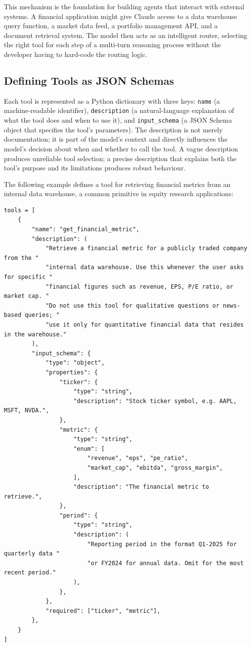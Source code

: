 This mechanism is the foundation for building agents that interact with external systems.
A financial application might give Claude access to a data warehouse query function,
a market data feed, a portfolio management API, and a document retrieval system. The
model then acts as an intelligent router, selecting the right tool for each step of a
multi-turn reasoning process without the developer having to hard-code the routing logic.

\subsection{Defining Tools as JSON Schemas}
\label{app:sdk-commercial:tools:schemas}

Each tool is represented as a Python dictionary with three keys: \texttt{name} (a
machine-readable identifier), \texttt{description} (a natural-language explanation of
what the tool does and when to use it), and \texttt{input\_schema} (a JSON Schema
object that specifies the tool's parameters). The description is not merely
documentation; it is part of the model's context and directly influences the model's
decision about when and whether to call the tool. A vague description produces
unreliable tool selection; a precise description that explains both the tool's purpose
and its limitations produces robust behaviour.

The following example defines a tool for retrieving financial metrics from an internal
data warehouse, a common primitive in equity research applications:

\begin{verbatim}
tools = [
    {
        "name": "get_financial_metric",
        "description": (
            "Retrieve a financial metric for a publicly traded company from the "
            "internal data warehouse. Use this whenever the user asks for specific "
            "financial figures such as revenue, EPS, P/E ratio, or market cap. "
            "Do not use this tool for qualitative questions or news-based queries; "
            "use it only for quantitative financial data that resides in the warehouse."
        ),
        "input_schema": {
            "type": "object",
            "properties": {
                "ticker": {
                    "type": "string",
                    "description": "Stock ticker symbol, e.g. AAPL, MSFT, NVDA.",
                },
                "metric": {
                    "type": "string",
                    "enum": [
                        "revenue", "eps", "pe_ratio",
                        "market_cap", "ebitda", "gross_margin",
                    ],
                    "description": "The financial metric to retrieve.",
                },
                "period": {
                    "type": "string",
                    "description": (
                        "Reporting period in the format Q1-2025 for quarterly data "
                        "or FY2024 for annual data. Omit for the most recent period."
                    ),
                },
            },
            "required": ["ticker", "metric"],
        },
    }
]
\end{verbatim}

